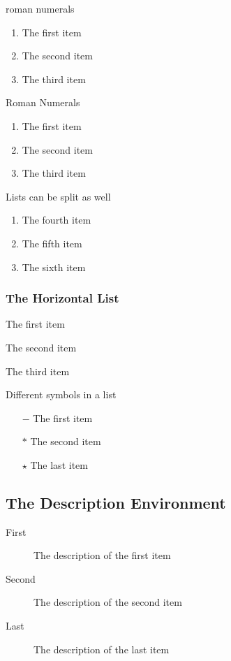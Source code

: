 \documentclass[letterpaper,12pt]{article}
\begin{document}
roman numerals
\begin{enumerate}[label=\roman*)]
  \item The first item
  \item The second item
  \item The third item
\end{enumerate}

Roman Numerals
\begin{enumerate}[label=\fbox{\Roman*}]
  \item The first item
  \item The second item
  \item The third item
\end{enumerate}

Lists can be split as well
\begin{enumerate}[resume*]
  \item The fourth item
  \item The fifth item
  \item The sixth item
\end{enumerate}

\subsubsection{The Horizontal List}
\begin{enumerate*}
  \item The first item
  \item The second item
  \item The third item
\end{enumerate*}

Different symbols in a list
\begin{enumerate}
  \item [$-$] The first item
  \item [$\ast$] The second item
  \item [$\star$] The last item
\end{enumerate}

\subsection{The Description Environment}
\begin{description}
  \item[First] The description of the first item
  \item[Second] The description of the second item
  \item[Last] The description of the last item
\end{description}
\end{document}
